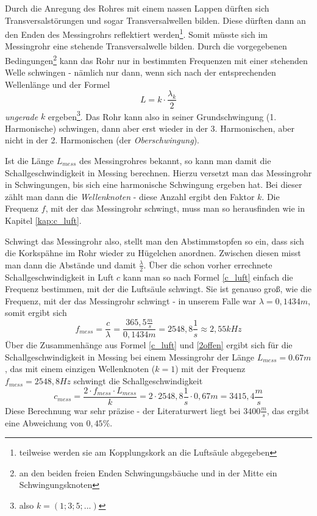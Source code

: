 Durch die Anregung des Rohres mit einem nassen Lappen dürften sich Transversalstörungen und sogar Transversalwellen bilden. Diese dürften dann an den Enden des Messingrohrs reflektiert werden\footnote{teilweise werden sie am Kopplungskork an die Luftsäule abgegeben}. Somit müsste sich im Messingrohr eine stehende Transversalwelle bilden. Durch die vorgegebenen Bedingungen\footnote{an den beiden freien Enden Schwingungsbäuche und in der Mitte ein Schwingungsknoten} kann das Rohr nur in bestimmten Frequenzen mit einer stehenden Welle schwingen - nämlich nur dann, wenn sich nach der entsprechenden Wellenlänge und der Formel
	\begin{equation}
 	L = k \cdot \frac{\lambda_k}{2}
	\label{2offen}
\end{equation}
\emph{ungerade} \(k\) ergeben\footnote{also \(k = (1;3;5;...)\)}. Das Rohr kann also in seiner Grundschwingung (1. Harmonische) schwingen, dann aber erst wieder in der 3. Harmonischen, aber nicht in der 2. Harmonischen (der \emph{Oberschwingung}).


Ist die Länge \(L_{mess}\) des Messingrohres bekannt, so kann man damit die Schallgeschwindigkeit in Messing berechnen. Hierzu versetzt man das Messingrohr in Schwingungen, bis sich eine harmonische Schwingung ergeben hat. Bei dieser zählt man dann die \textit{Wellenknoten} - diese Anzahl ergibt den Faktor \(k\). Die Frequenz \(f\), mit der das Messingrohr schwingt, muss man so herausfinden wie in Kapitel \ref{kap:c_luft}.

Schwingt das Messingrohr also, stellt man den Abstimmstopfen so ein, dass sich die Korkspähne im Rohr wieder zu Hügelchen anordnen. Zwischen diesen misst man dann die Abstände und damit \(\frac{\lambda}{2}\). Über die schon vorher errechnete Schallgeschwindigkeit in Luft \(c\) kann man so nach Formel \ref{c_luft} einfach die Frequenz bestimmen, mit der die Luftsäule schwingt. Sie ist genauso groß, wie die Frequenz, mit der das Messingrohr schwingt - in unserem Falle war \(\lambda = 0,1434m\), somit ergibt sich
	\begin{equation}
 f_{mess} = \frac{c}{\lambda} = \frac{365,5\frac{m}{s}}{0,1434m} = 2548,8 \frac{1}{s} \approx 2,55 kHz
\end{equation}
Über die Zusammenhänge aus Formel \ref{c_luft} und \ref{2offen} ergibt sich für die Schallgeschwindigkeit in Messing bei einem Messingrohr der Länge \(L_{mess} = 0.67m\), das mit einem einzigen Wellenknoten (\(k = 1\)) mit der Frequenz \(f_{mess} = 2548,8 Hz\) schwingt die Schallgeschwindigkeit
	\begin{equation}
 	c_{mess} = \frac{2 \cdot f_{mess} \cdot L_{mess}}{k} = 2 \cdot 2548,8 \frac{1}{s} \cdot 0,67m = 3415,4 \frac{m}{s}
	\label{causf}
\end{equation}
Diese Berechnung war sehr präzise - der Literaturwert liegt bei \(3400 \frac{m}{s}\), das ergibt eine Abweichung von \(0,45\%\).


